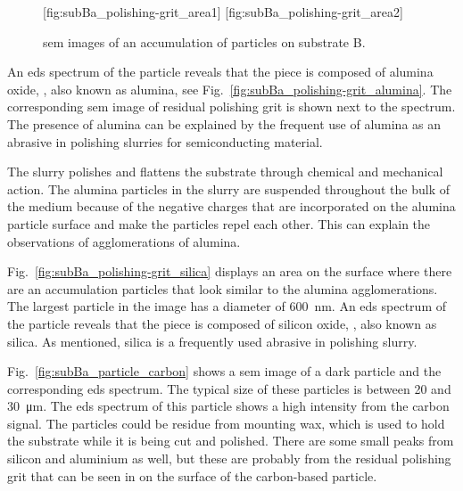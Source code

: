 \begin{figure}[htbp]
    \centering
        [fig:subBa_polishing-grit_area1]
        [fig:subBa_polishing-grit_area2]
    \caption[\Ac{sem} images of particles on substrate B.]{\Acf{sem} images of an accumulation of particles on substrate B.}\label{fig:subBa_polishing-grit_area}
\end{figure}

An \ac{eds} spectrum of the particle reveals that the piece is composed of alumina oxide, , also known as alumina, see Fig.~\ref{fig:subBa_polishing-grit_alumina}. The corresponding \ac{sem} image of residual polishing grit is shown next to the spectrum. The presence of alumina can be explained by the frequent use of alumina as an abrasive in polishing slurries for semiconducting material.

The slurry polishes and flattens the substrate through chemical and mechanical action. The alumina particles in the slurry are suspended throughout the bulk of the medium because of the negative charges that are incorporated on the alumina particle surface and make the particles repel each other. This can explain the observations of agglomerations of alumina. 

Fig.~\ref{fig:subBa_polishing-grit_silica} displays an area on the surface where there are an accumulation particles that look similar to the alumina agglomerations. The largest particle in the image has a diameter of \SI{600}{\nano\metre}. An \ac{eds} spectrum of the particle reveals that the piece is composed of silicon oxide, , also known as silica. As mentioned, silica is a frequently used abrasive in polishing slurry.

Fig.~\ref{fig:subBa_particle_carbon} shows a \ac{sem} image of a dark particle and the corresponding \ac{eds} spectrum. The typical size of these particles is between \SI{20}{} and \SI{30}{\micro\metre}. The \ac{eds} spectrum of this particle shows a high intensity from the carbon signal. The particles could be residue from mounting wax, which is used to hold the substrate while it is being cut and polished. There are some small peaks from silicon and aluminium as well, but these are probably from the residual polishing grit that can be seen in on the surface of the carbon-based particle.

